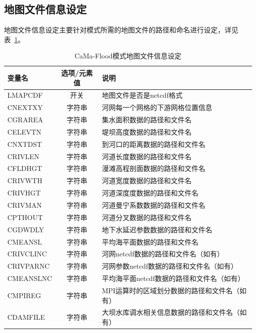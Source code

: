 \documentclass[a4paper,12pt,twoside]{article}
\begin{document}
\subsection{地图文件信息设定}
地图文件信息设定主要针对模式所需的地图文件的路径和命名进行设定，详见表~\ref{CaMa-Flood模式地图文件信息设定}。
\begin{table}[!htbp]
\caption{CaMa-Flood模式地图文件信息设定}
\centering \renewcommand{\arraystretch}{1.5}
\label{CaMa-Flood模式地图文件信息设定}

\begin{tabular}{lcp{}}
\toprule
\textbf{变量名} & \textbf{选项/元素值} & \textbf{说明} \\\midrule
LMAPCDF & 开关 & 地图文件是否是netcdf格式 \\
CNEXTXY & 字符串 & 河网每一个网格的下游网格位置信息 \\
CGRAREA & 字符串 & 集水面积数据的路径和文件名 \\
CELEVTN & 字符串 & 堤坝高度数据的路径和文件名 \\
CNXTDST & 字符串 & 到河口的距离数据的路径和文件名 \\
CRIVLEN & 字符串 & 河道长度数据的路径和文件名 \\
CFLDHGT & 字符串 & 漫滩高程剖面数据的路径和文件名 \\
CRIVWTH & 字符串 & 河道宽度数据的路径和文件名 \\
CRIVHGT & 字符串 & 河道深度度数据的路径和文件名 \\
CRIVMAN & 字符串 & 河道曼宁系数数据的路径和文件名 \\
CPTHOUT & 字符串 & 河道分叉数据的路径和文件名 \\
CGDWDLY & 字符串 & 地下水延迟参数数据的路径和文件名 \\
CMEANSL & 字符串 & 平均海平面数据的路径和文件名 \\
CRIVCLINC & 字符串 & 河网netcdf数据的路径和文件名（如有） \\
CRIVPARNC & 字符串 & 河网参数netcdf数据的路径和文件名（如有） \\
CMEANSLNC & 字符串 & 平均海平面netcdf数据的路径和文件名（如有） \\
CMPIREG & 字符串 & {MPI}运算时的区域划分数据的路径和文件名（如有） \\
CDAMFILE & 字符串 & 大坝水库调水相关信息数据的路径和文件名（如有） \\
\bottomrule
\end{tabular}
\end{table}
\end{document}
